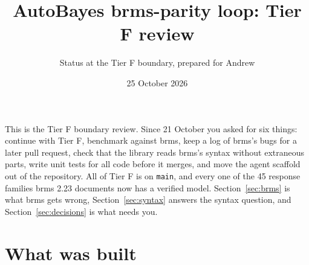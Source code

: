 \documentclass[11pt]{article}
\title{AutoBayes brms-parity loop: Tier F review}
\author{Status at the Tier F boundary, prepared for Andrew}
\date{25 October 2026}
\newcommand{\code}[1]{\texttt{#1}}
\begin{document}
\maketitle

\noindent This is the Tier F boundary review. Since 21 October you asked for six things: continue with Tier F, benchmark
against brms, keep a log of brms's bugs for a later pull request, check that the library reads brms's syntax without
extraneous parts, write unit tests for all code before it merges, and move the agent scaffold out of the repository. All of
Tier F is on \code{main}, and every one of the 45 response families brms 2.23 documents now has a verified model.
Section~\ref{sec:brms} is what brms gets wrong, Section~\ref{sec:syntax} answers the syntax question, and
Section~\ref{sec:decisions} is what needs you.

\section{What was built}
\end{document}
